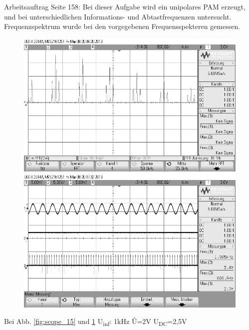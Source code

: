 \documentclass[12pt,a4paper]{scrartcl}
\begin{document}
    Arbeitsauftrag Seite 158:
    Bei dieser Aufgabe wird ein unipolares PAM erzeugt, und bei unterschiedlichen Informations- und Abtastfrequenzen untersucht. Frequenzspektrum wurde bei den vorgegebenen Frequensspekteren gemessen.\\
     \begin{figure}[htbp]
    \begin{minipage}{0.48\textwidth}
     \centering
      \includegraphics[width=1\textwidth]{scope_15}
      \caption{}
      \label{fig:scope_15}
    \end{minipage}\hfill
    \begin{minipage}{0.48\textwidth}
     \centering
      \includegraphics[width=1\textwidth]{scope_16}
      \caption{}
      \label{fig:scope_16}
    \end{minipage}
  \end{figure} 
  Bei Abb. \ref{fig:scope_15} und \ref{fig:scope_16} U\textsubscript{inf}:  1kHz \^{U}=2V
        U\textsubscript{DC}=2,5V
\end{document}
